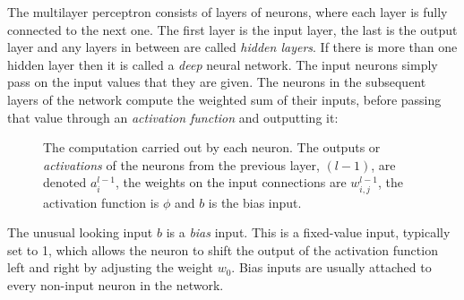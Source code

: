 \documentclass[a4paper, 12pt]{report}
\newcommand{\tit}[1]{\textit{#1}}
\begin{document}
The multilayer perceptron consists of layers of neurons, where each layer is fully connected to the next one. The first layer is the input layer, the last is the output layer and any layers in between are called \tit{hidden layers}. If there is more than one hidden layer then it is called a \tit{deep} neural network. The input neurons simply pass on the input values that they are given. The neurons in the subsequent layers of the network compute the weighted sum of their inputs, before passing that value through an \tit{activation function} and outputting it:

\begin{figure}[h]
\captionsetup{justification=centering}
\begin{center}
\caption{The computation carried out by each neuron. The outputs or \tit{activations} of the neurons from the previous layer, $(l - 1)$, are denoted $a_i^{l-1}$, the weights on the input connections are $w_{i,j}^{l-1}$, the activation function is $\phi$ and $b$ is the bias input.}
\label{fig:neuron}
\end{center}
\end{figure}

The unusual looking input $b$ is a \tit{bias} input. This is a fixed-value input, typically set to 1, which allows the neuron to shift the output of the activation function left and right by adjusting the weight $w_0$. Bias inputs are usually attached to every non-input neuron in the network. \\
\end{document}
